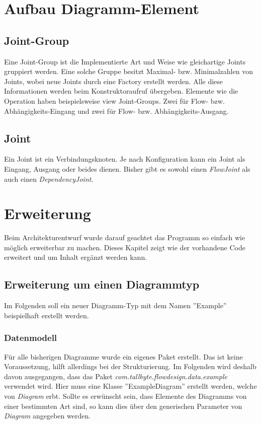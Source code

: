 \section{Aufbau Diagramm-Element}
\subsection{Joint-Group}
Eine Joint-Group ist die Implementierte Art und Weise wie gleichartige Joints gruppiert werden.
Eine solche Gruppe besitzt Maximal- bzw. Minimalzahlen von Joints, wobei neue Joints durch eine
Factory erstellt werden. Alle diese Informationen werden beim Konstruktoraufruf übergeben.
Elemente wie die Operation haben beispielsweise view Joint-Groups. Zwei für Flow- bzw. Abhängigkeits-Eingang
und zwei für Flow- bzw. Abhängigkeits-Ausgang.

\subsection{Joint}
Ein Joint ist ein Verbindungsknoten. Je nach Konfiguration kann ein Joint als Eingang, Ausgang oder beides dienen.
Bisher gibt es sowohl einen \textit{FlowJoint} als auch einen \textit{DependencyJoint}.

\pagebreak
\section{Erweiterung}
Beim Architekturentwurf wurde darauf geachtet das Programm so einfach wie möglich erweiterbar zu machen.
Dieses Kapitel zeigt wie der vorhandene Code erweitert und um Inhalt ergänzt werden kann.

\subsection{Erweiterung um einen Diagrammtyp}
Im Folgenden soll ein neuer Diagramm-Typ mit dem Namen ''Example'' beispielhaft erstellt werden.

\subsubsection{Datenmodell}
Für alle bisherigen Diagramme wurde ein eigenes Paket erstellt. Das ist keine Voraussetzung, hilft allerdings bei der
Strukturierung. Im Folgenden wird deshalb davon ausgegangen, dass das Paket \textit{com.tallbyte.flowdesign.data.example}
verwendet wird.
Hier muss eine Klasse ''ExampleDiagram'' erstellt werden, welche von \textit{Diagram} erbt. Sollte es erwünscht sein,
dass Elemente des Diagramms von einer bestimmten Art sind, so kann dies über den generischen Parameter von 
\textit{Diagram} angegeben werden.

